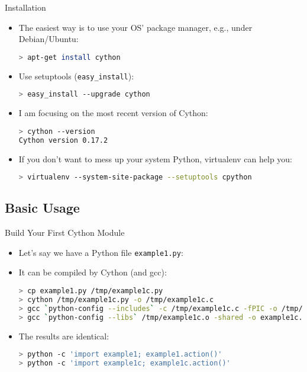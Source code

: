 \documentclass[dvips,xcolor=pst,14pt]{beamer}
\begin{document}
\begin{frame}[fragile]{
%
Installation
%
}
\begin{itemize}
\item The easiest way is to use your OS' package manager, e.g., under
Debian/Ubuntu:
\begin{lstlisting}[language=bash]
> apt-get install cython
\end{lstlisting}
\item Use setuptools (\verb+easy_install+):
\begin{lstlisting}[language=bash]
> easy_install --upgrade cython
\end{lstlisting}
\item I am focusing on the most recent version of Cython:
\begin{lstlisting}[language=bash]
> cython --version
Cython version 0.17.2
\end{lstlisting}
\item If you don't want to mess up your system Python, virtualenv can help you:
\begin{lstlisting}[basicstyle=\scriptsize\ttfamily,language=bash]
> virtualenv --system-site-package --setuptools cpython
\end{lstlisting}
\end{itemize}
\end{frame}

\subsection{
Basic Usage
}

\begin{frame}[fragile]{
%
Build Your First Cython Module
%
}
\begin{itemize}
\item Let's say we have a Python file \verb+example1.py+:

\item It can be compiled by Cython (and gcc):
\begin{lstlisting}[basicstyle=\scriptsize\ttfamily,language=bash]
> cp example1.py /tmp/example1c.py
> cython /tmp/example1c.py -o /tmp/example1c.c
> gcc `python-config --includes` -c /tmp/example1c.c -fPIC -o /tmp/example1c.o
> gcc `python-config --libs` /tmp/example1c.o -shared -o example1c.so
\end{lstlisting}
\item The results are identical:
\begin{lstlisting}[basicstyle=\scriptsize\ttfamily,language=bash]
> python -c 'import example1; example1.action()'
> python -c 'import example1c; example1c.action()'
\end{lstlisting}
\end{itemize}
\end{frame}
\end{document}
